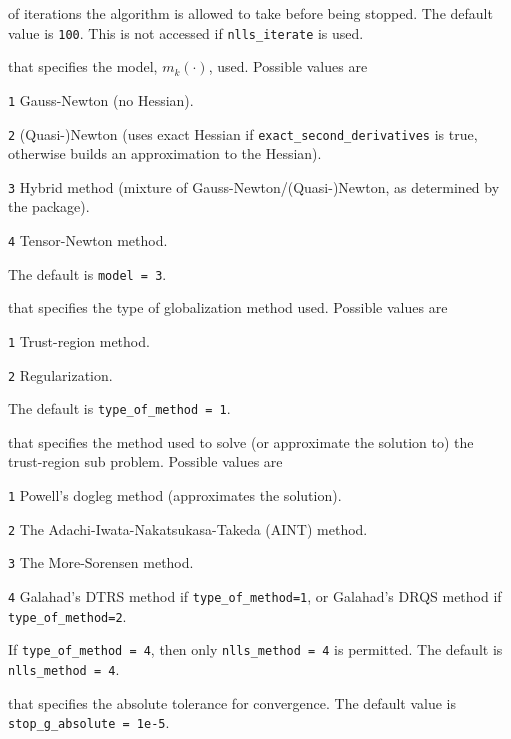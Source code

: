 \begin{description}

of iterations the algorithm is allowed to take before being stopped.  The default value is {\tt 100}.  This is not accessed if {\tt nlls\_iterate} is used.

that specifies the model, $m_k(\cdot)$, used.  Possible values are
\begin{description}
  \item{\tt 1} Gauss-Newton (no Hessian).
  \item{\tt 2} (Quasi-)Newton (uses exact Hessian if {\tt exact\_second\_derivatives} is true, otherwise builds an approximation to the Hessian).
  \item{\tt 3} Hybrid method (mixture of Gauss-Newton/(Quasi-)Newton, as determined by the package).
  \item{\tt 4} Tensor-Newton method.
\end{description}
The default is {\tt model = 3}.

that specifies the type of globalization method used.  Possible values are
\begin{description}
  \item{\tt 1} Trust-region method.
  \item{\tt 2} Regularization.
\end{description}
The default is {\tt type\_of\_method = 1}.

that specifies the method used to solve (or approximate the solution to) the trust-region sub problem.  Possible values are
\begin{description}
  \item{\tt 1} Powell's dogleg method (approximates the solution).
  \item{\tt 2} The Adachi-Iwata-Nakatsukasa-Takeda (AINT) method.
  \item{\tt 3} The More-Sorensen method.
  \item{\tt 4} {\sc Galahad}'s {\sc DTRS} method if {\tt type\_of\_method=1}, or {\sc Galahad}'s {\sc DRQS} method if {\tt type\_of\_method=2}.
\end{description}
If {\tt type\_of\_method = 4}, then only {\tt nlls\_method = 4} is permitted.
The default is {\tt nlls\_method = 4}.

that specifies the absolute tolerance for convergence.
The default value is {\tt stop\_g\_absolute = 1e{-5}}.


\end{description}
